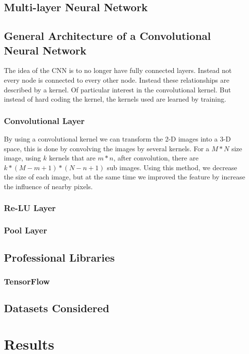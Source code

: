 \documentclass[12pt, twocolumn]{article}
\begin{document}
\subsection{Multi-layer Neural Network}

\subsection{General Architecture of a Convolutional Neural Network}
The idea of the CNN is to no longer have fully connected layers. Instead not every node is connected to every other node. Instead these relationships are described by a kernel. Of particular interest in the convolutional kernel. But instead of hard coding the kernel, the kernels used are learned by training.

\subsubsection{Convolutional Layer}


By using a convolutional kernel we can  transform the 2-D images into a 3-D space, this is done by convolving the images by several kernels. For a  $M * N $ size image, using $k$ kernels that are $m * n$,  after convolution, there are  $ k * (M - m + 1) * (N - n + 1) $ sub images. Using this method, we decrease the size of each image, but at the same time we improved the feature by increase the influence of nearby pixels. \subsubsection{Re-LU Layer}
\subsubsection{Pool Layer}

\subsection{Professional Libraries}
\subsubsection{TensorFlow}

\subsection{Datasets Considered}


\section{Results}
\end{document}
